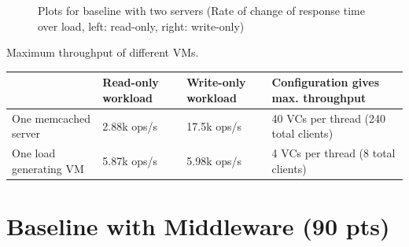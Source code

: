 \documentclass[11pt,a4paper]{article}
\begin{document}
\begin{figure}[!h]
  \centering
  \caption{Plots for baseline with two servers (Rate of change of response time over load, left: read-only, right: write-only)}
  \label{fig:baseline_no_mw_2_server_maxtp}
\end{figure}

\begin{center}
	{Maximum throughput of different VMs.}
	\begin{tabular}{|l|p{2cm}|p{2cm}|p{4cm}|}
		\hline                        & Read-only workload & Write-only workload & Configuration gives max. throughput  \\ 
        \hline One memcached server   & 2.88k ops/s        & 17.5k ops/s         & 40 VCs per thread (240 total clients)\\ 
        \hline One load generating VM & 5.87k ops/s        & 5.98k ops/s         & 4 VCs per thread (8 total clients)   \\  
		\hline 
	\end{tabular}
\end{center}


\section{Baseline with Middleware (90 pts)}
\label{sec:3.1}
\end{document}
